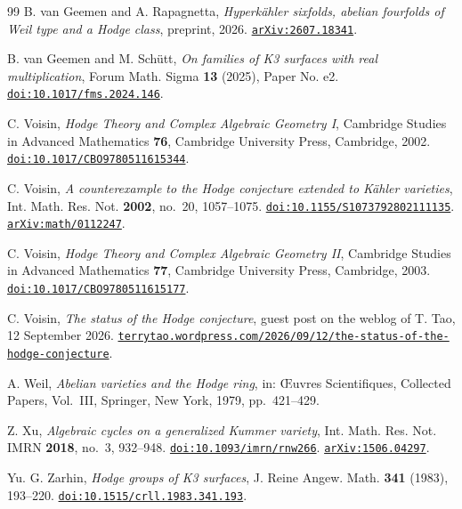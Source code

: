 \begin{thebibliography}{99}
B. van Geemen and A. Rapagnetta,
\emph{Hyperk\"ahler sixfolds, abelian fourfolds of Weil type and a Hodge
class},
preprint, 2026.
\href{https://arxiv.org/abs/2607.18341}{\texttt{arXiv:2607.18341}}.

B. van Geemen and M. Sch\"utt,
\emph{On families of K3 surfaces with real multiplication},
Forum Math. Sigma \textbf{13} (2025), Paper No. e2.
\href{https://doi.org/10.1017/fms.2024.146}{\texttt{doi:10.1017/fms.2024.146}}.

C. Voisin,
\emph{Hodge Theory and Complex Algebraic Geometry I},
Cambridge Studies in Advanced Mathematics \textbf{76},
Cambridge University Press, Cambridge, 2002.
\href{https://doi.org/10.1017/CBO9780511615344}{\texttt{doi:10.1017/CBO9780511615344}}.

C. Voisin,
\emph{A counterexample to the Hodge conjecture extended to K\"ahler
varieties},
Int. Math. Res. Not. \textbf{2002}, no.~20, 1057--1075.
\href{https://doi.org/10.1155/S1073792802111135}{\texttt{doi:10.1155/S1073792802111135}}.
\href{https://arxiv.org/abs/math/0112247}{\texttt{arXiv:math/0112247}}.

C. Voisin,
\emph{Hodge Theory and Complex Algebraic Geometry II},
Cambridge Studies in Advanced Mathematics \textbf{77},
Cambridge University Press, Cambridge, 2003.
\href{https://doi.org/10.1017/CBO9780511615177}{\texttt{doi:10.1017/CBO9780511615177}}.

C. Voisin,
\emph{The status of the Hodge conjecture},
guest post on the weblog of T. Tao, 12 September 2026.
\href{https://terrytao.wordpress.com/2026/09/12/the-status-of-the-hodge-conjecture/}%
{\texttt{terrytao.wordpress.com/2026/09/12/the-status-of-the-hodge-conjecture}}.

A. Weil,
\emph{Abelian varieties and the Hodge ring},
in: \OE uvres Scientifiques, Collected Papers, Vol.~III,
Springer, New York, 1979, pp.~421--429.

Z. Xu,
\emph{Algebraic cycles on a generalized Kummer variety},
Int. Math. Res. Not. IMRN \textbf{2018}, no.~3, 932--948.
\href{https://doi.org/10.1093/imrn/rnw266}{\texttt{doi:10.1093/imrn/rnw266}}.
\href{https://arxiv.org/abs/1506.04297}{\texttt{arXiv:1506.04297}}.

Yu. G. Zarhin,
\emph{Hodge groups of K3 surfaces},
J. Reine Angew. Math. \textbf{341} (1983), 193--220.
\href{https://doi.org/10.1515/crll.1983.341.193}{\texttt{doi:10.1515/crll.1983.341.193}}.


\end{thebibliography}
